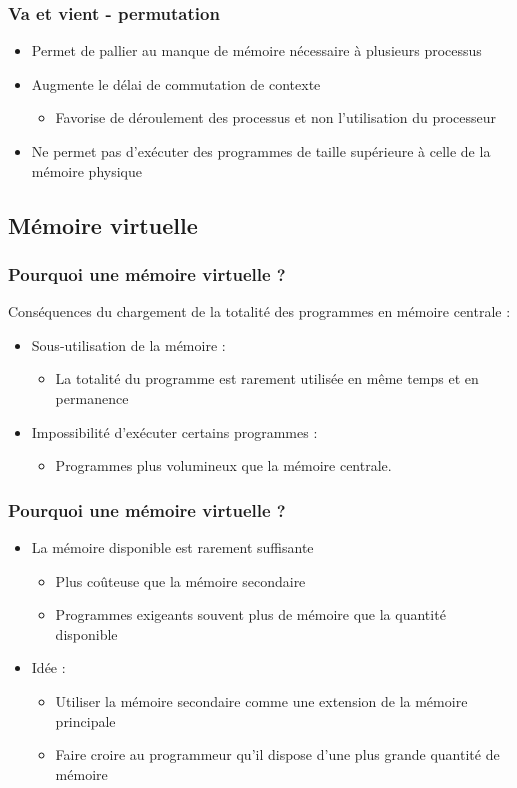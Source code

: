 \begin{frame}
\frametitle{Va et vient - permutation}
\begin{itemize}
\item Permet de pallier au manque de mémoire nécessaire à plusieurs processus
\item Augmente le délai de commutation de contexte
\begin{itemize}
\item Favorise de déroulement des processus et non l'utilisation du processeur
\end{itemize}
\item Ne permet pas d'exécuter des programmes de taille supérieure à celle de la mémoire physique
\end{itemize}
\end{frame}



\subsection{Mémoire virtuelle}
\begin{frame}
\frametitle{Pourquoi une mémoire virtuelle ?}
Conséquences du chargement de la totalité des programmes en mémoire centrale :
\begin{itemize}
\item Sous-utilisation de la mémoire :
\begin{itemize}
\item La totalité du programme est rarement utilisée en même temps et en permanence
\end{itemize}
\item Impossibilité d'exécuter certains programmes :
\begin{itemize}
\item Programmes plus volumineux que la mémoire centrale. 
\end{itemize}
\end{itemize}
\end{frame}


\begin{frame}
\frametitle{Pourquoi une mémoire virtuelle ?}
\begin{itemize}
\item La mémoire disponible est rarement suffisante
\begin{itemize}
\item Plus coûteuse que la mémoire secondaire
\item Programmes exigeants souvent plus de mémoire que la quantité disponible
\end{itemize}
\item Idée :
\begin{itemize}
\item Utiliser la mémoire secondaire comme une extension de la mémoire principale
\item Faire croire au programmeur qu'il dispose d'une plus grande quantité de mémoire
\end{itemize}
\end{itemize}
\end{frame}


